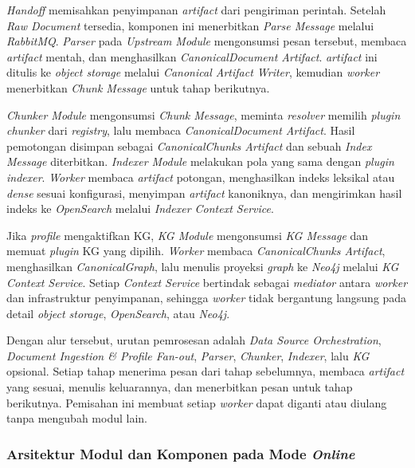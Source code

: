 \emph{Handoff} memisahkan penyimpanan \emph{artifact} dari pengiriman perintah. Setelah
\emph{Raw Document} tersedia, komponen ini menerbitkan \emph{Parse Message} melalui
\emph{RabbitMQ}. \emph{Parser} pada \emph{Upstream Module} mengonsumsi pesan tersebut, membaca
\emph{artifact} mentah, dan menghasilkan \emph{CanonicalDocument Artifact}. \emph{artifact} ini
ditulis ke \emph{object storage} melalui \emph{Canonical Artifact Writer}, kemudian
\emph{worker} menerbitkan \emph{Chunk Message} untuk tahap berikutnya.

\emph{Chunker Module} mengonsumsi \emph{Chunk Message}, meminta \emph{resolver} memilih
\emph{plugin} \emph{chunker} dari \emph{registry}, lalu membaca \emph{CanonicalDocument Artifact}.
Hasil pemotongan disimpan sebagai \emph{CanonicalChunks Artifact} dan sebuah
\emph{Index Message} diterbitkan. \emph{Indexer Module} melakukan pola yang sama
dengan \emph{plugin} \emph{indexer}. \emph{Worker} membaca \emph{artifact} potongan, menghasilkan indeks
leksikal atau \emph{dense} sesuai konfigurasi, menyimpan \emph{artifact} kanoniknya, dan
mengirimkan hasil indeks ke \emph{OpenSearch} melalui \emph{Indexer Context Service}.

Jika \emph{profile} mengaktifkan KG, \emph{KG Module} mengonsumsi \emph{KG Message} dan
memuat \emph{plugin} KG yang dipilih. \emph{Worker} membaca \emph{CanonicalChunks Artifact},
menghasilkan \emph{CanonicalGraph}, lalu menulis proyeksi \emph{graph} ke \emph{Neo4j} melalui
\emph{KG Context Service}. Setiap \emph{Context Service} bertindak sebagai
\emph{mediator} antara \emph{worker} dan infrastruktur penyimpanan, sehingga \emph{worker} tidak
bergantung langsung pada detail \emph{object storage}, \emph{OpenSearch}, atau \emph{Neo4j}.

Dengan alur tersebut, urutan pemrosesan adalah \emph{Data Source Orchestration},
\emph{Document Ingestion \& Profile Fan-out}, \emph{Parser}, \emph{Chunker},
\emph{Indexer}, lalu \emph{KG} opsional. Setiap tahap menerima pesan dari tahap
sebelumnya, membaca \emph{artifact} yang sesuai, menulis keluarannya, dan menerbitkan
pesan untuk tahap berikutnya. Pemisahan ini membuat setiap \emph{worker} dapat diganti
atau diulang tanpa mengubah modul lain.

\subsubsection{Arsitektur Modul dan Komponen pada Mode \emph{Online}}
\label{subsubsec:rancangan-modul-komponen-online}


